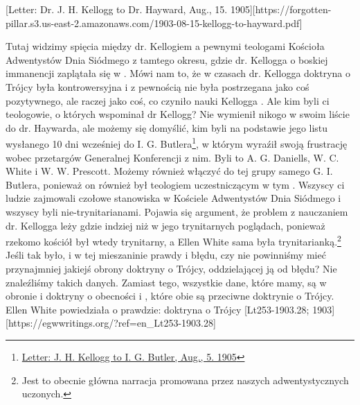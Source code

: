 
[Letter: Dr. J. H. Kellogg to Dr. Hayward, Aug., 15. 1905][https://forgotten-pillar.s3.us-east-2.amazonaws.com/1903-08-15-kellogg-to-hayward.pdf]

Tutaj widzimy spięcia między dr. Kellogiem a pewnymi teologami Kościoła Adwentystów Dnia Siódmego z tamtego okresu, gdzie  dr. Kellogga o boskiej immanencji zaplątała się w . Mówi nam to, że w czasach dr. Kellogga doktryna o Trójcy była kontrowersyjna i z pewnością nie była postrzegana jako coś pozytywnego, ale raczej jako coś, co czyniło nauki Kellogga . Ale kim byli ci teologowie, o których wspominał dr Kellogg? Nie wymienił nikogo w swoim liście do dr. Haywarda, ale możemy się domyślić, kim byli  na podstawie jego listu wysłanego 10 dni wcześniej do I. G. Butlera\footnote{\href{https://forgotten-pillar.s3.us-east-2.amazonaws.com/1905-08-05-kellogg-butler.pdf}{Letter: J. H. Kellogg to I. G. Butler, Aug., 5. 1905}}, w którym wyraźił swoją frustrację wobec przetargów Generalnej Konferencji z nim. Byli to A. G. Daniells, W. C. White i W. W. Prescott. Możemy również włączyć do tej grupy samego G. I. Butlera, ponieważ on również był teologiem uczestniczącym w tym . Wszyscy ci ludzie zajmowali czołowe stanowiska w Kościele Adwentystów Dnia Siódmego i wszyscy byli nie-trynitarianami. Pojawia się argument, że problem z nauczaniem dr. Kellogga leży gdzie indziej niż w jego trynitarnych poglądach, ponieważ rzekomo kościół był wtedy trynitarny, a Ellen White sama była trynitarianką.\footnote{Jest to obecnie główna narracja promowana przez naszych adwentystycznych uczonych.} Jeśli tak było, i w tej mieszaninie prawdy i błędu, czy nie powinniśmy mieć przynajmniej jakiejś obrony doktryny o Trójcy, oddzielającej ją od błędu? Nie znaleźliśmy takich danych. Zamiast tego, wszystkie dane, które mamy, są w obronie  i doktryny o obecności i , które obie są przeciwne doktrynie o Trójcy. Ellen White powiedziała o prawdzie: doktryna o Trójcy [Lt253-1903.28; 1903][https://egwwritings.org/?ref=en\_Lt253-1903.28]

